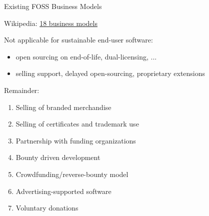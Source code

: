 \documentclass[t]{beamer}
\begin{document}
\begin{frame}[label=obs3]{Existing FOSS Business Models}

Wikipedia: \href{https://en.wikipedia.org/wiki/Business_models_for_open-source_software}{18 business models}

\pause
\medskip
Not applicable for sustainable end-user software:
\begin{itemize}
 \item open sourcing on end-of-life,  dual-licensing, ...
 \pause
 \item selling support,  delayed open-sourcing, proprietary extensions
\end{itemize}

Remainder:

\begin{enumerate}
\item Selling of branded merchandise
\item Selling of certificates and trademark use
\item Partnership with funding organizations
\item Bounty driven development
\item Crowdfunding/reverse-bounty model
\item Advertising-supported software
\item Voluntary donations
\end{enumerate}


\end{frame}

\end{document}
